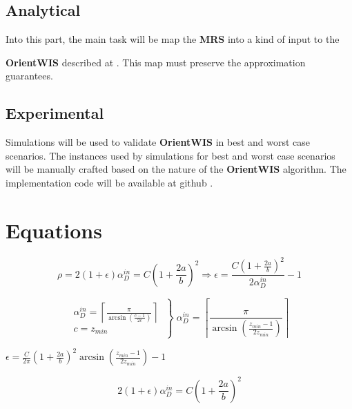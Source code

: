 \documentclass[conference]{IEEEtran}
\begin{document}
  \subsection{Analytical}
    Into this part, 
    the main task will be map the {\bf MRS} \cite{olga:2012} 
    into a kind of input to the {{\bf OrientWIS} described at \cite{pengjun:2014}.
    This map must preserve the approximation guarantees.
  \subsection{Experimental}
    Simulations will be used to validate {\bf OrientWIS} in best and worst case scenarios.
    The instances used by simulations for best and worst case scenarios will be manually crafted
    based on the nature of the {\bf OrientWIS} algorithm.
    The implementation code will be available at github \cite{mfer:gitMRS}.
  \newpage
  \section{Equations}

  \begin{equation}
    \rho = 2(1+\epsilon)\alpha^{in}_{D}= C\left(1+\frac{2a}{b}\right)^{2} 
    \Longrightarrow 
    \epsilon = \frac{C\left(1+\frac{2a}{b}\right)^{2}}{2\alpha^{in}_{D}} - 1
  \end{equation}    

  \begin{equation}
    \begin{array}{rl}
      \alpha^{in}_{D}= \left\lceil \frac{\pi}{\arcsin \left( \frac{c-1}{2c} \right)} \right\rceil\\
      c = z_{min}
    \end{array}     
    \left\}
      \alpha^{in}_{D}= \left\lceil \frac{\pi}{\arcsin \left( \frac{z_{min}-1}{2z_{min}} \right)} \right\rceil 
    \right.
  \end{equation}  

  $\epsilon = \frac{C}{2\pi}\left(1+\frac{2a}{b}\right)^{2} \arcsin \left( \frac{z_{min}-1}{2z_{min}} \right)  - 1$

  \begin{equation}
    2(1+\epsilon)\alpha^{in}_{D}= C\left(1+\frac{2a}{b}\right)^{2} 
  \end{equation}        

}
\end{document}
